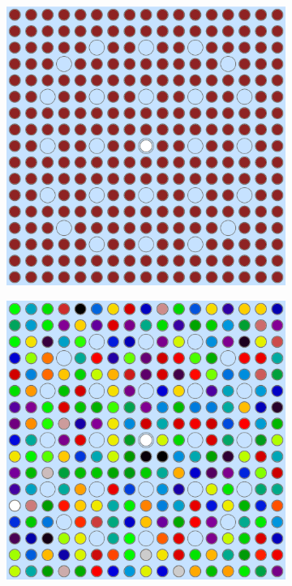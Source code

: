 \begin{figure}[h!]
\centering
\begin{subfigure}{0.33\textwidth}
  \centering
  \includegraphics[width=0.9\linewidth]{figures/assembly/geometry}
  \caption{}
  \label{fig:null-assm}
\end{subfigure}
\begin{subfigure}{0.33\textwidth}
  \centering
  \includegraphics[width=0.9\linewidth]{figures/assembly/degenerate-materials}

\end{subfigure}
\end{figure}

